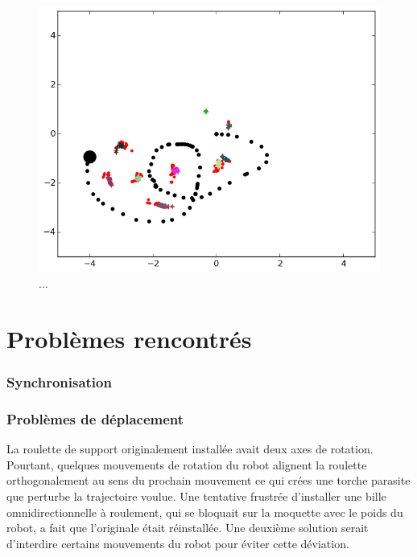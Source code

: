 \begin{figure}[H]
	\includegraphics[width=\textwidth]{map.png}
	\caption{...}	
	\label{fig:multi_map}
\end{figure}

\section{Problèmes rencontrés}

\subsubsection{Synchronisation}

\subsubsection{Problèmes de déplacement}

La roulette de support originalement installée avait deux axes de
rotation. Pourtant, quelques mouvements de rotation du robot alignent
la roulette orthogonalement au sens du prochain mouvement ce qui crées
une torche parasite que perturbe la trajectoire voulue. Une tentative
frustrée d'installer une bille omnidirectionnelle à roulement, qui se
bloquait sur la moquette avec le poids du robot, a fait que
l'originale était réinstallée. Une deuxième solution serait d'interdire
certains mouvements du robot pour éviter cette déviation.
